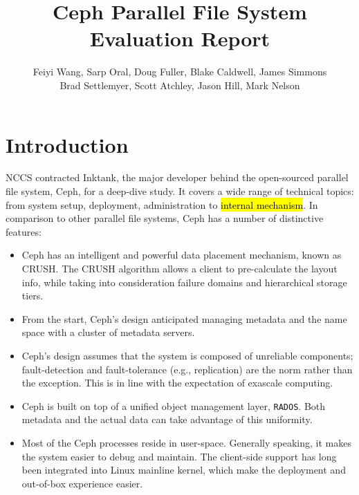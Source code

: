 \documentclass{article}
\title{Ceph Parallel File System Evaluation Report}
\author{Feiyi Wang, Sarp Oral, Doug Fuller, Blake Caldwell, James Simmons\\
Brad Settlemyer, Scott Atchley, Jason Hill, Mark Nelson}
\begin{document}


\pagebreak
\thispagestyle{empty}
\tableofcontents

\pagebreak
\thispagestyle{empty}
\listoffigures

\clearpage
{}


\section{Introduction}

NCCS contracted Inktank, the major developer behind the open-sourced parallel
file system, Ceph, for a deep-dive study. It covers a wide range of technical
topics: from system setup, deployment, administration to \hl{internal mechanism}. In
comparison to other parallel file systems, Ceph has a number of distinctive
features:

\begin{itemize}
  \item Ceph has an intelligent and powerful data placement mechanism, known as
  CRUSH. The CRUSH algorithm allows a client to pre-calculate the layout
  info, while taking into consideration failure domains and hierarchical storage tiers.
  
  \item From the start, Ceph's design anticipated managing metadata and the name space
  with a cluster of metadata servers.

\item Ceph's design assumes that the system is composed of
unreliable components; fault-detection and fault-tolerance (e.g., replication) are
the norm rather than the exception. This is in line with the expectation of
exascale computing.

\item Ceph is built on top of a unified object management layer,
\texttt{RADOS}. Both metadata and the actual data can take advantage of this
uniformity.

\item Most of the Ceph processes reside in user-space. Generally speaking, it makes the
system easier to debug and maintain. The client-side support has long been
integrated into Linux mainline kernel, which make the deployment and out-of-box
experience easier.

\end{itemize}
\end{document}
